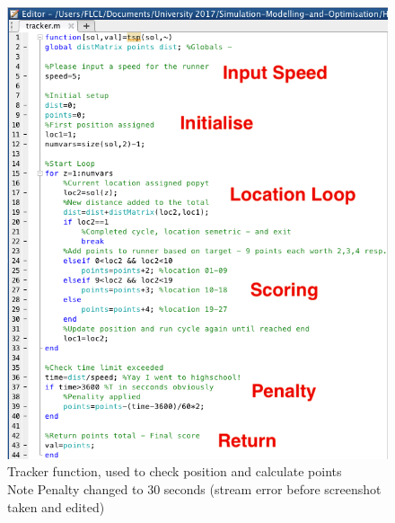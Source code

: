 \documentclass[a4paper, 10pt]{IEEEconf}
\begin{document}
\begin{figure}[H]
  \includegraphics[width=\linewidth, center]{images/tracker}
  \caption{Tracker function, used to check position and calculate points \\ Note Penalty changed to 30 seconds (stream error before screenshot taken and edited)}
  \label{fig:Tracker function, used to check position and calculate points}
\end{figure}
\end{document}
